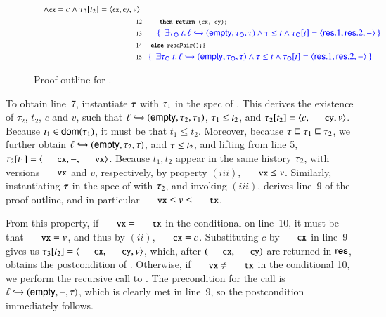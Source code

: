 \begin{wrapfigure}{r}{0.5\textwidth}
\begin{align*}
{\begin{array}{r@{\ \ \ }l@{\ }l}
{\begin{array}{l@{\ }l}
      \aand \esc{cx} = c \aand
      \inat{\angled{\esc{cx}, \esc{cy}, v}}{\hist_3}{t_2}
    \end{array}
  } & 
  \\[1.5pt]
  \Num{12} &  \quad~\esc{\textbf{then return}~(cx, cy);} 
  \\[1.5pt]
  \Num{13} & 
  \quad \spec{~~ 
  \exists \histO\ t\ldot \histso{\hps}{\hempty, \histO, \hist} \aand \hist \le t \aand \inat{\angled{\res.1, \res.2, -}}{\histO}{t} ~}
  &
 \\[1.5pt]
  \Num{14} &  ~\esc{\textbf{else} readPair();\}}
  \\[1.5pt]
\Num{15} & \spec{~~
   \exists \histO\ t\ldot \histso{\hps}{\hempty, \histO, \hist} \aand \hist \le t \aand \inat{\angled{\res.1, \res.2, -}}{\histO}{t} ~}
\end{array}
}
\end{align*}
\caption{Proof outline for .}
\label{fig:pair-proof}
\end{wrapfigure}
%
To obtain line~7, instantiate $\tau$ with $\tau_1$ in the spec of
. This derives the existence of $\tau_2$, $t_2$, $c$ and
$v$, such that ${\ell} \hookrightarrow ({\mathsf{empty}, \tau_2, \tau_1})$, $\tau_1
\le t_2$, and $\inat{\angled{c, \eesc{cy}, v}}{\hist_2}{t_2}$. Because
$t_1 \in \mathsf{dom}(\tau_1)$, it must be that $t_1 \le t_2$. Moreover,
because $\tau \sqsubseteq \tau_1 \sqsubseteq \tau_2$, we further obtain
${\ell} \hookrightarrow ({\mathsf{empty}, \tau_2, \tau})$, and $\tau \le t_2$, and
lifting from line 5, $\inat{\angled{\eesc{cx}, -,
    \eesc{vx}}}{\hist_2}{t_1}$. Because $t_1, t_2$ appear in the same
history $\tau_2$, with versions $\eesc{vx}$ and $v$, respectively, by
property $(iii)$, $\eesc{vx} \le v$. Similarly, instantiating $\tau$
in the spec of  with $\tau_2$, and invoking $(iii)$,
derives line~9 of the proof outline, and in particular $\eesc{vx} \le v
\le \eesc{tx}$.

From this property, if $\eesc{vx} = \eesc{tx}$ in the conditional on
line~10, it must be that $\eesc{vx} = v$, and thus by $(ii)$, $\eesc{cx} =
c$. Substituting $c$ by $\eesc{cx}$ in line~9 gives us
$\inat{\angled{\eesc{cx}, \eesc{cy}, v}}{\hist_3}{t_2}$, which, after
$(\eesc{cx}, \eesc{cy})$ are returned in $\mathsf{res}$, obtains the
postcondition of . Otherwise, if $\eesc{vx} \neq
\eesc{tx}$ in the conditional 10, we perform the recursive call to
. The precondition for the call is
${\ell} \hookrightarrow ({\mathsf{empty}, -, \tau})$, which is clearly met in line~9, so
the postcondition immediately follows.

